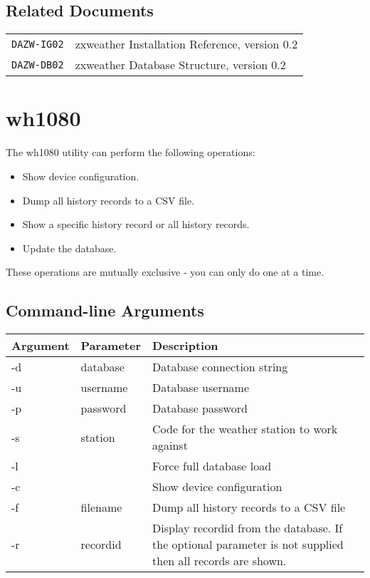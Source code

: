 \documentclass[a4paper,10pt,draft]{book}
\begin{document}
\section{Related Documents}
\begin{tabular}{l l}
\verb|DAZW-IG02| & zxweather Installation Reference, version 0.2 \\
\verb|DAZW-DB02| & zxweather Database Structure, version 0.2 \\
\end{tabular}

\chapter{wh1080}

The wh1080 utility can perform the following operations:
\begin{itemize}
\item Show device configuration.
\item Dump all history records to a CSV file.
\item Show a specific history record or all history records.
\item Update the database.
\end{itemize}
These operations are mutually exclusive - you can only do one at a time.

\section{Command-line Arguments}
\begin{tabular}{l l p{10cm}}
\hline
\textbf{Argument} & \textbf{Parameter} & \textbf{Description} \\
\hline
-d & database & Database connection string \\
-u & username & Database username \\
-p & password & Database password \\
-s & station  & Code for the weather station to work against \\
-l &  & Force full database load \\
-c &  & Show device configuration \\
-f & filename & Dump all history records to a CSV file \\
-r & recordid & Display recordid from the database. If the optional parameter is not supplied then all records are shown. \\
\hline
\end{tabular}
\end{document}
